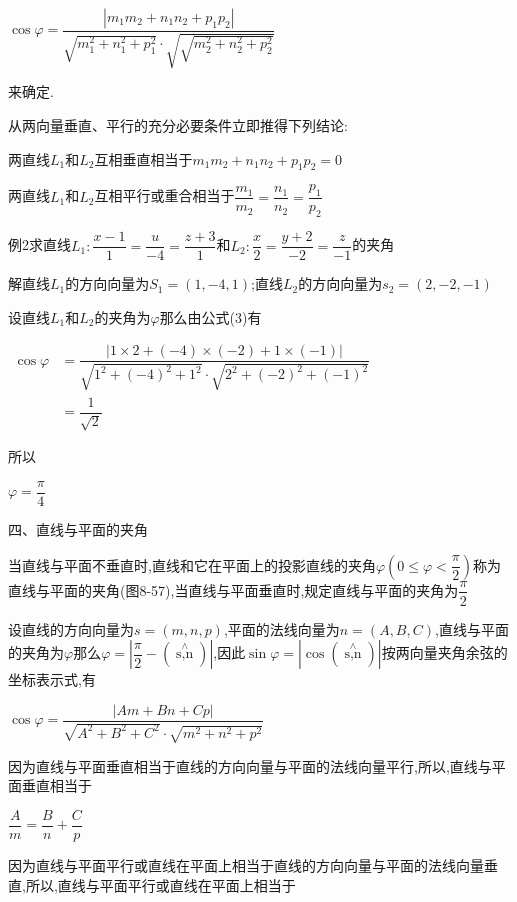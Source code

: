 \documentclass[oneside]{book}
\begin{document}
${{\cos}}\varphi  = \dfrac{{|{m_1}{m_2} + {n_1}{n_2} + {p_1}{p_2}|}}{{\sqrt {m_1^2 + n_1^2 + p_1^2}  \cdot \sqrt {\sqrt {m_2^2 + n_2^2 + p_2^2} } }}$

来确定.

从两向量垂直、平行的充分必要条件立即推得下列结论:

两直线${L_1}$和${L_2}$互相垂直相当于${m_1}{m_2} + {n_1}{n_2} + {p_1}{p_2} = 0$

两直线${L_1}$和${L_2}$互相平行或重合相当于$\dfrac{{{m_1}}}{{{m_2}}} = \dfrac{{{n_1}}}{{{n_2}}} = \dfrac{{{p_1}}}{{{p_2}}}$

例2求直线${L_1}:\dfrac{{x - 1}}{1} = \dfrac{u}{{ - 4}} = \dfrac{{z + 3}}{1}$和${L_2}:\dfrac{x}{2} = \dfrac{{y + 2}}{{ - 2}} = \dfrac{z}{{ - 1}}$的夹角

解直线${L_1}$的方向向量为${S_1} = (1, - 4,1)$;直线${L_2}$的方向向量为${s_2} = \left( {2, - 2, - 1} \right)$

设直线${L_1}$和${L_2}$的夹角为$\varphi $那么由公式(3)有

$\begin{aligned} \cos \varphi &=\dfrac{|1 \times 2+(-4) \times(-2)+1 \times(-1)|}{\sqrt{1^{2}+(-4)^{2}+1^{2}} \cdot \sqrt{2^{2}+(-2)^{2}+(-1)^{2}}} \\ &=\dfrac{1}{\sqrt{2}} \end{aligned}$

所以

$\varphi  = \dfrac{\pi }{4}$

四、直线与平面的夹角

当直线与平面不垂直时,直线和它在平面上的投影直线的夹角$\varphi \left( {0 \leqslant \varphi  < \dfrac{\pi }{2}} \right)$称为直线与平面的夹角(图8-57),当直线与平面垂直时,规定直线与平面的夹角为$\dfrac{\pi }{2}$

设直线的方向向量为$s=(m,n,p)$,平面的法线向量为$n=(A,B,C)$,直线与平面的夹角为$\varphi $那么$\varphi  = \left| {\dfrac{\pi }{2} - (\mathop {s,n}\limits^ \wedge  )} \right|$,因此$\sin \varphi  = |\cos (\mathop {s,n}\limits^ \wedge  )|$按两向量夹角余弦的坐标表示式,有

$\cos \varphi  = \dfrac{{|Am + Bn + Cp|}}{{\sqrt {{A^2} + {B^2} + {C^2}}  \cdot \sqrt {{m^2} + {n^2} + {p^2}} }}$

因为直线与平面垂直相当于直线的方向向量与平面的法线向量平行,所以,直线与平面垂直相当于

$\dfrac{A}{m} = \dfrac{B}{n} + \dfrac{C}{p}$

因为直线与平面平行或直线在平面上相当于直线的方向向量与平面的法线向量垂直,所以,直线与平面平行或直线在平面上相当于
\end{document}
